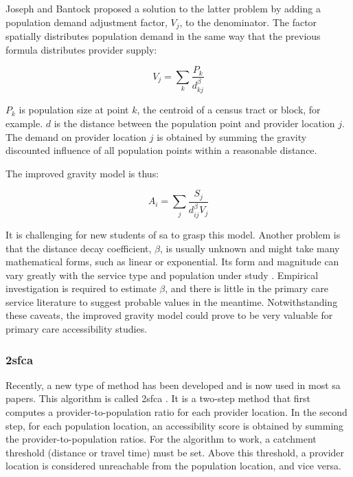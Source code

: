 Joseph and Bantock \cite{joseph_measuring_1982} proposed a solution to the latter problem by adding a population demand adjustment factor, $V_j$, to the denominator. The factor spatially distributes population demand in the same way that the previous formula distributes provider supply:

\begin{equation}
    V_j = \sum_k \frac{P_k}{d_{kj}^{\beta}}
\end{equation}

$P_k$ is population size at point $k$, the centroid of a census tract or block, for example. $d$ is the distance between the population point and provider location $j$. The demand on provider location $j$ is obtained by summing the gravity discounted influence of all population points within a reasonable distance.

The improved gravity model is thus:

\begin{equation}
    A_i = \sum_j \frac{S_j}{d_{ij}^{\beta} V_j}
\end{equation}

It is challenging for new students of \ac{sa} to grasp this model. Another problem is that the distance decay coefficient, $\beta$, is usually unknown and might take many mathematical forms, such as linear or exponential. Its form and magnitude can vary greatly with the service type and population under study \cite{talen_assessing_1998}. Empirical investigation is required to estimate $\beta$, and there is little in the primary care service literature to suggest probable values in the meantime. Notwithstanding these caveats, the improved gravity model could prove to be very valuable for primary care accessibility studies.

\subsubsection*{\acf{2sfca}}

Recently, a new type of method has been developed and is now used in most \ac{sa} papers. This algorithm is called \ac{2sfca} \cite{luo_using_2004}. It is a two-step method that first computes a provider-to-population ratio for each provider location. In the second step, for each population location, an accessibility score is obtained by summing the provider-to-population ratios. For the algorithm to work, a catchment threshold (distance or travel time) must be set. Above this threshold, a provider location is considered unreachable from the population location, and vice versa.

